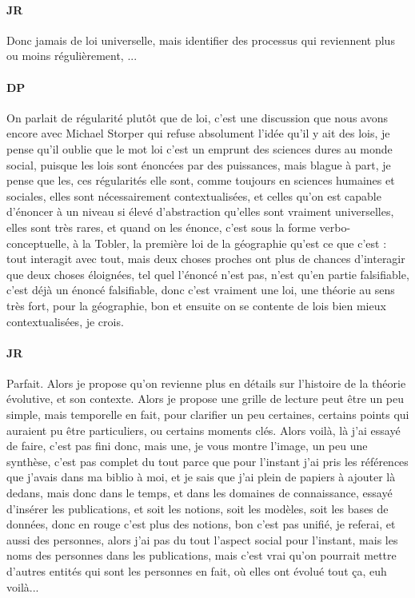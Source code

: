 \documentclass[12pt]{article}
\begin{document}
\paragraph{JR}

Donc jamais de loi universelle, mais identifier des processus qui reviennent plus ou moins régulièrement, ...

\paragraph{DP}

On parlait de régularité plutôt que de loi, c'est une discussion que nous avons encore avec Michael Storper qui refuse absolument l'idée qu'il y ait des lois, je pense qu'il oublie que le mot loi c'est un emprunt des sciences dures au monde social, puisque les lois sont énoncées par des puissances, mais blague à part, je pense que les, ces régularités elle sont, comme toujours en sciences humaines et sociales, elles sont nécessairement contextualisées, et celles qu'on est capable d'énoncer à un niveau si élevé d'abstraction qu'elles sont vraiment universelles, elles sont très rares, et quand on les énonce, c'est sous la forme verbo-conceptuelle, à la Tobler, la première loi de la géographie qu'est ce que c'est : tout interagit avec tout, mais deux choses proches ont plus de chances d'interagir que deux choses éloignées, tel quel l'énoncé n'est pas, n'est qu'en partie falsifiable, c'est déjà un énoncé falsifiable, donc c'est vraiment une loi, une théorie au sens très fort, pour la géographie, bon et ensuite on se contente de lois bien mieux contextualisées, je crois.

\paragraph{JR}

Parfait. Alors je propose qu'on revienne plus en détails sur l'histoire de la théorie évolutive, et son contexte. Alors je propose une grille de lecture peut être un peu simple, mais temporelle en fait, pour clarifier un peu certaines, certains points qui auraient pu être particuliers, ou certains moments clés. Alors voilà, là j'ai essayé de faire, c'est pas fini donc, mais une, je vous montre l'image, un peu une synthèse, c'est pas complet du tout parce que pour l'instant j'ai pris les références que j'avais dans ma biblio à moi, et je sais que j'ai plein de papiers à ajouter là dedans, mais donc dans le temps, et dans les domaines de connaissance, essayé d'insérer les publications, et soit les notions, soit les modèles, soit les bases de données, donc en rouge c'est plus des notions, bon c'est pas unifié, je referai, et aussi des personnes, alors j'ai pas du tout l'aspect social pour l'instant, mais les noms des personnes dans les publications, mais c'est vrai qu'on pourrait mettre d'autres entités qui sont les personnes en fait, où elles ont évolué tout ça, euh voilà...
\end{document}
